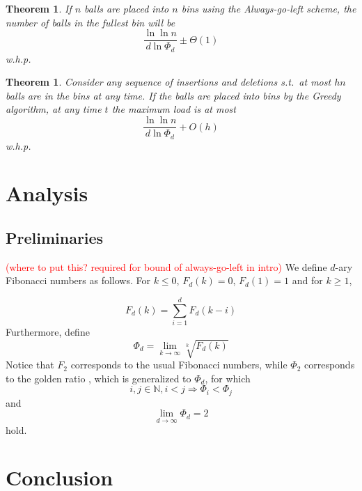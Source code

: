 \documentclass[a4paper,12pt]{article}
\newcommand\todo[1]{\textcolor{red}{(#1)}}
\newtheorem{theorem}[lemma]{Theorem}
\begin{document}
\begin{theorem}
If $n$ balls are placed into $n$ bins using the Always-go-left scheme, the number of balls in the fullest bin will be 
\[
\frac{\ln\ln n}{d \ln \Phi_d} \pm \Theta(1)
\]
w.h.p.
\end{theorem}

\begin{theorem}
Consider any sequence of insertions and deletions s.t.~at most $hn$ balls are in the bins at any time. If the balls are placed into bins by the Greedy algorithm, at any time $t$ the maximum load is at most 
\[
\frac{\ln\ln n}{d \ln \Phi_d} + O(h)
\]
w.h.p.
\end{theorem}

\section{Analysis}
\label{sec:analysis}

\subsection{Preliminaries}
\label{sec:preliminaries}
\todo{where to put this? required for  bound of always-go-left in intro}
We define $d$-ary Fibonacci numbers as follows. For $k \leq0$, $F_d(k) = 0$, $F_d(1) = 1$ and for $k \geq 1$,

\[
F_d(k) = \sum_{i=1}^{d}F_d(k-i)
\]
Furthermore, define 
\[
\Phi_d = \lim_{k \rightarrow \infty} \sqrt[k]{F_d(k)}
\]
Notice that $F_2$ corresponds to the usual Fibonacci numbers, while $\Phi_2 $ corresponds to the golden ratio \cite{Knuth73}, which is generalized to $\Phi_d$, for which 
\[
i, j \in \mathbb{N}, i < j \Rightarrow \Phi_i < \Phi_j
\]
and 
\[
\lim_{d\rightarrow \infty} \Phi_d = 2
\]
hold.

\section{Conclusion}
\label{sec:conclusion}


 
\end{document}
